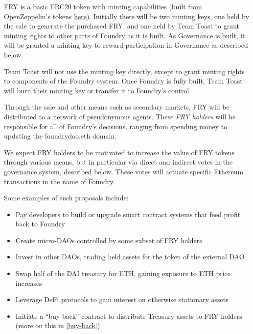 \documentclass{article}
\begin{document}
FRY is a basic ERC20 token with minting capabilities (built from OpenZeppelin's tokens \href{https://github.com/OpenZeppelin/openzeppelin-contracts/tree/b1e811430a0a57211bdc5d48bee0fe0ba9101139/contracts/token/ERC20}{here}). Initially there will be two minting keys, one held by the sale to generate the purchased FRY, and one held by Team Toast to grant minting rights to other parts of Foundry as it is built. As Governance is built, it will be granted a minting key to reward participation in Governance as described below.

Team Toast will not use the minting key directly, except to grant minting rights to components of the Foundry system. Once Foundry is fully built, Team Toast will burn their minting key or transfer it to Foundry's control.

Through the sale and other means such as secondary markets, FRY will be distributed to a network of pseudonymous agents. These \textit{FRY holders} will be responsible for all of Foundry's decisions, ranging from spending money to updating the foundrydao.eth domain.

We expect FRY holders to be motivated to increase the value of FRY tokens through various means, but in particular via direct and indirect votes in the governance system, described below. These votes will actuate specific Ethereum transactions in the name of Foundry.

Some examples of such proposals include:

\begin{itemize}

\item Pay developers to build or upgrade smart contract systems that feed profit back to Foundry

\item Create micro-DAOs controlled by some subset of FRY holders

\item Invest in other DAOs, trading held assets for the token of the external DAO

\item Swap half of the DAI treasury for ETH, gaining exposure to ETH price increases

\item Leverage DeFi protocols to gain interest on otherwise stationary assets

\item Initiate a ``buy-back'' contract to distribute Treasury assets to FRY holders (more on this in \ref{buy-back})

\end{itemize}
\end{document}
